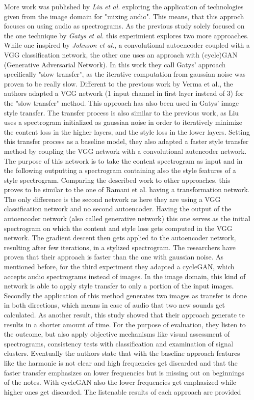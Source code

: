 More work was published by \textit{Liu et al.} \cite{Liu2019} exploring the application of technologies given from the image domain for "mixing audio". This means, that this approch focuses on using audio as spectrograms. As the previous study solely focused on the one technique by \textit{Gatys et al.} this experimient explores two more approaches. While one inspired by \textit{Johnson et al.}, a convolutional autoencoder coupled with a VGG classification network, the other one uses an approach with (cycle)GAN (Generative Adversarial Network). In this work they call Gatys' approach specifically "slow transfer", as the iterative computation from gaussian noise was proven to be really slow. Different to the previous work by Verma et al., the authors adapted a VGG network (1 input channel in first layer instead of 3) for the "slow transfer" method. This approach has also been used in Gatys' image style transfer. The transfer process is also similar to the previous work, as Liu uses a spectrogram initialized as gaussian noise in order to iteratively minimize the content loss in the higher layers, and the style loss in the lower layers. Setting this transfer process as a baseline model, they also adapted a faster style transfer method by coupling the VGG network with a convolutional autencoder network. The purpose of this network is to take the content spectrogram as input and in the following outputting a spectrogram containing also the style features of a style spectrogram. Comparing the described work to other approaches, this proves to be similar to the one of Ramani et al. having a transformation network. The only difference is the second network as here they are using a VGG classification network and no second autoencoder. Having the output of the autoencoder network (also called generative network) this one serves as the initial spectrogram on which the content and style loss gets computed in the VGG network. The gradient descent then gets applied to the autoencoder network, resulting after few iterations, in a stylized spectrogram. The researchers have proven that their approach is faster than the one with gaussian noise. As mentioned before, for the third experiment they adapted a cycleGAN, which accepts audio spectrograms instead of images. In the image domain, this kind of network is able to apply style transfer to only a portion of the input images. Secondly the application of this method generates two images as transfer is done in both directions, which means in case of audio that two new sounds get calculated. As another result, this study showed that their approach generate te results in a shorter amount of time. For the purpose of evaluation, they listen to the outcome, but also apply objective mechanisms like visual assessment of spectrograms, consistency tests with classification and examination of signal clusters. Eventually the authors state that with the baseline approach features like the harmonic is not clear and high frequencies get discarded and that the faster transfer emphasizes on lower frequencies but is missing out on beginnings of the notes. With cycleGAN also the lower frequencies get emphasized while higher ones get discarded. The listenable results of each approach are provided 